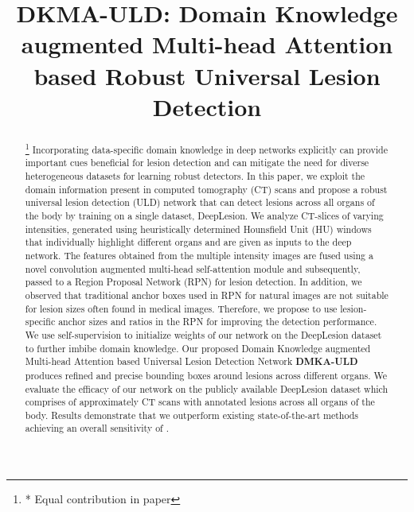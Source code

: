 \documentclass{bmvc2k}
\title{DKMA-ULD: Domain Knowledge augmented Multi-head Attention based Robust Universal Lesion Detection}
\renewcommand{\thefootnote}{\fnsymbol{footnote}}
\begin{document}
\maketitle
\begin{abstract}
\let\thefootnote\relax\footnote{* Equal contribution in paper}
Incorporating data-specific domain knowledge in deep networks explicitly can provide important cues beneficial for lesion detection and can mitigate the need for diverse heterogeneous datasets for learning robust detectors. In this paper, we exploit the domain information present in computed tomography (CT) scans and propose a robust universal lesion detection (ULD) network that can detect lesions across all organs of the body by training on a single dataset, DeepLesion. We analyze CT-slices of varying intensities, generated using heuristically determined Hounsfield Unit (HU) windows that individually highlight different organs and are given as inputs to the deep network. The features obtained from the multiple intensity images are fused using a novel convolution augmented multi-head self-attention module and subsequently, passed to a Region Proposal Network (RPN) for lesion detection. In addition, we observed that traditional anchor boxes used in RPN for natural images are not suitable for lesion sizes often found in medical images. Therefore, we propose to use lesion-specific anchor sizes and ratios in the RPN for improving the detection performance. We use self-supervision to initialize weights of our network on the DeepLesion dataset to further imbibe domain knowledge. Our proposed Domain Knowledge augmented Multi-head Attention based Universal Lesion Detection Network \textbf{DMKA-ULD} produces refined and precise bounding boxes around lesions across different organs. We evaluate the efficacy of our network on the publicly available DeepLesion dataset which comprises of approximately  CT scans with annotated lesions across all organs of the body. Results demonstrate that we outperform existing state-of-the-art methods achieving an overall sensitivity of .
\end{abstract}
\end{document}
